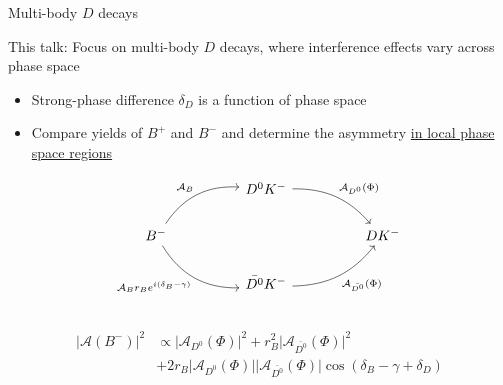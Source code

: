 \documentclass[xcolor={dvipsnames}]{beamer}
\begin{document}
\begin{frame}[fragile]{Multi-body $D$ decays}
  \begin{center}
    This talk: Focus on multi-body $D$ decays, where interference effects vary across phase space
  \end{center}
  \vspace{-0.3cm}
  \begin{itemize}
    \setlength\itemsep{0.5em}
    \item{Strong-phase difference $\delta_D$ is a function of phase space}
    \item{Compare yields of $B^+$ and $B^-$ and determine the asymmetry \underline{in local phase space regions}}
  \end{itemize}
  \begin{equation*}
    \begin{tikzcd}[column sep=huge]
      & D^0K^- \arrow[dr, bend left = 25, "\mathcal{A}_{D^0}(\Phi)"] & \\
      B^- \arrow[ur, bend left, "\mathcal{A}_B"] \arrow[dr, bend right, "\mathcal{A}_B r_B e^{i(\delta_B - \gamma)}"'] & [5cm] & DK^- \\
      & \bar{D^0}K^- \arrow[ur, bend right = 25, "\mathcal{A}_{\bar{D^0}}(\Phi)"'] & \\
    \end{tikzcd}
  \end{equation*}
  \vspace{-0.9cm}
  \begin{align*}
    \lvert\mathcal{A}(B^-)\lvert^2&\propto\lvert\mathcal{A}_{D^0}(\Phi)\lvert^2 + r_B^2\lvert\mathcal{A}_{\bar{D^0}}(\Phi)\lvert^2 \\
    &+ 2r_B\lvert\mathcal{A}_{D^0}(\Phi)\lvert\lvert\mathcal{A}_{\bar{D^0}}(\Phi)\lvert\cos(\delta_B - \gamma + \delta_D)
  \end{align*}
\end{frame}
\end{document}
